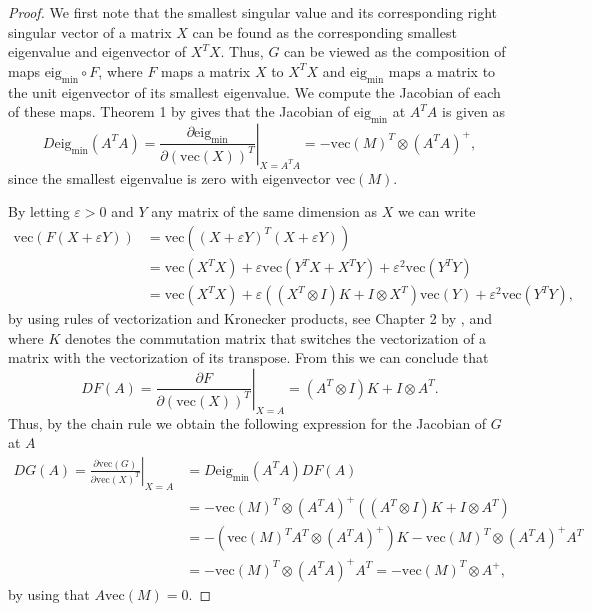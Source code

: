 \documentclass{biometrika}
\begin{document}
\begin{proof}
    We first note that the smallest singular value and its corresponding right singular vector of a matrix $X$ can be found as the corresponding smallest eigenvalue and eigenvector of $X^TX$. Thus, $G$ can be viewed as the composition of maps $\mathrm{eig}_{\mathrm{min}} \circ F$, where $F$ maps a matrix $X$ to $X^T X$ and $\mathrm{eig}_{\mathrm{min}}$ maps a matrix to the unit 
    eigenvector of its smallest eigenvalue. We compute the Jacobian of each of these maps.
    Theorem 1 by \cite{Magnus_1985} gives that the Jacobian of $\mathrm{eig}_{\mathrm{min}}$ 
    at $A^TA$ is given as 
    $$D\mathrm{eig}_{\mathrm{min}}(A^TA) = \left. \frac{\partial \mathrm{eig}_{\mathrm{min}}}{\partial(\mathrm{vec}(X))^T} \right|_{X = A^TA} = -\mathrm{vec}(M)^T \otimes (A^TA)^{+},$$ 
    since the smallest eigenvalue is zero with eigenvector $\mathrm{vec}(M)$.
    
    By letting $\varepsilon > 0$ and $Y$ any matrix of the same dimension as $X$ we can write
    \begin{align*}
        \mathrm{vec}(F(X + \varepsilon Y)) &= \mathrm{vec} \left((X + \varepsilon Y)^T(X + \varepsilon Y)\right) \\
        &=\mathrm{vec}(X^TX) + \varepsilon \mathrm{vec}\left(Y^T X + X^T Y \right)  + \varepsilon^2 \mathrm{vec}( Y^T Y ) \\
        &= \mathrm{vec}(X^TX) + \varepsilon ((X^T \otimes I)K + I \otimes X^T) \mathrm{vec}(Y)  + \varepsilon^2 \mathrm{vec}( Y^T Y ),
    \end{align*}
    by using rules of vectorization and Kronecker products, see Chapter 2 by \cite{magnus_neudecker_2019}, and where $K$ denotes the commutation matrix that switches the vectorization of a matrix with the vectorization of its transpose. From this we can conclude that 
    $$DF(A) = \left. \frac{\partial F}{\partial(\mathrm{vec}(X))^T} \right|_{X = A} = (A^T \otimes I)K + I \otimes A^T.$$ 
    Thus, by the chain rule we obtain the following expression for the Jacobian of $G$ at $A$
    \begin{align*}
        DG(A) = \left. \frac{\partial \mathrm{vec}(G)}{\partial \mathrm{vec}(X)^T} \right|_{X = A}
        &= D\mathrm{eig}_{\mathrm{min}}(A^TA) DF(A) \\
        &= -\mathrm{vec}(M)^T \otimes (A^TA)^{+} ((A^T \otimes I)K + I \otimes A^T) \\ 
        &= -(\mathrm{vec}(M)^T A^T \otimes (A^TA)^{+})K -\mathrm{vec}(M)^T \otimes (A^TA)^{+} A^T \\
        &= -\mathrm{vec}(M)^T \otimes (A^TA)^{+} A^T = -\mathrm{vec}(M)^T \otimes A^{+},
    \end{align*}
    by using that $A \mathrm{vec}(M) = 0$. 
\end{proof}
\end{document}
